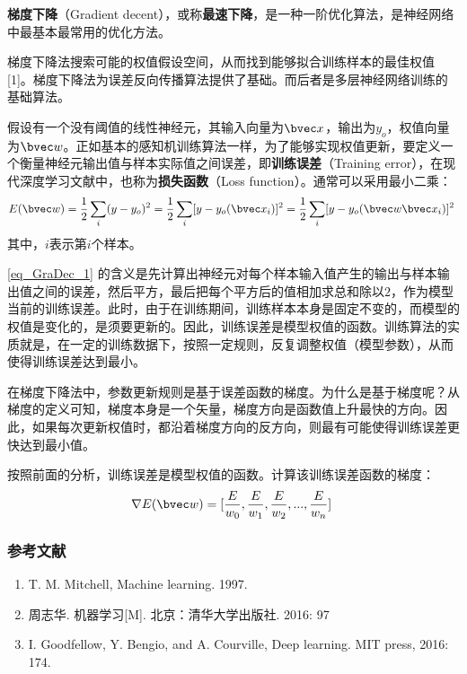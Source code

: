
\textbf{梯度下降}（Gradient decent），或称\textbf{最速下降}，是一种一阶优化算法，是神经网络中最基本最常用的优化方法。

梯度下降法搜索可能的权值假设空间，从而找到能够拟合训练样本的最佳权值 [1]。梯度下降法为误差反向传播算法提供了基础。而后者是多层神经网络训练的基础算法。

假设有一个没有阈值的线性神经元，其输入向量为$\bvec x$，输出为$y_o$，权值向量为$\bvec w$。正如基本的感知机训练算法一样，为了能够实现权值更新，要定义一个衡量神经元输出值与样本实际值之间误差，即\textbf{训练误差}（Training error），在现代深度学习文献中，也称为\textbf{损失函数}（Loss function）。通常可以采用最小二乘：
\begin{equation}\label{eq_GraDec_1}
E(\bvec w)=\frac{1}{2}\sum_i(y-y_o)^2=\frac{1}{2}\sum_i[y-y_o(\bvec x_i)]^2=\frac{1}{2}\sum_i[y-y_o(\bvec w \bvec x_i)]^2~
\end{equation}
其中，$i$表示第$i$个样本。

\autoref{eq_GraDec_1} 的含义是先计算出神经元对每个样本输入值产生的输出与样本输出值之间的误差，然后平方，最后把每个平方后的值相加求总和除以$2$，作为模型当前的训练误差。此时，由于在训练期间，训练样本本身是固定不变的，而模型的权值是变化的，是须要更新的。因此，训练误差是模型权值的函数。训练算法的实质就是，在一定的训练数据下，按照一定规则，反复调整权值（模型参数），从而使得训练误差达到最小。

在梯度下降法中，参数更新规则是基于误差函数的梯度。为什么是基于梯度呢？从梯度的定义可知，梯度本身是一个矢量，梯度方向是函数值上升最快的方向。因此，如果每次更新权值时，都沿着梯度方向的反方向，则最有可能使得训练误差更快达到最小值。

按照前面的分析，训练误差是模型权值的函数。计算该训练误差函数的梯度：
\begin{equation}
\nabla E(\bvec w)=[\frac{E}{w_0},\frac{E}{w_1},\frac{E}{w_2},...,\frac{E}{w_n}]~
\end{equation}




\subsubsection{参考文献}
\begin{enumerate}
\item T. M. Mitchell, Machine learning. 1997.
\item 周志华. 机器学习[M]. 北京：清华大学出版社. 2016: 97
\item I. Goodfellow, Y. Bengio, and A. Courville, Deep learning. MIT press, 2016: 174.
\end{enumerate}